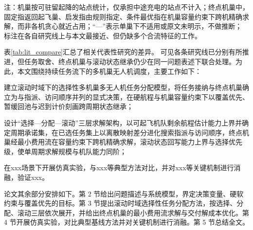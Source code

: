 \begin{table}[!htb]
    \vspace{2pt}
    \begin{minipage}{\textwidth}
        \songti 注：机巢按可驻留起降的站点统计，仅承担中途充电的站点不计入；终点机巢中，固定指返回起飞巢、启发指由规则指定、条件最优指在机巢容量约束下跨机精确求解，而非各机贪心就近占用；``—''表示单巢下不适用或原文未明示，不做推断；\dag\,标注在各自研究线上与本文最接近、但仍缺多个合流特征的工作。
    \end{minipage}
\end{table}


表\ref{tab:lit_compare}汇总了相关代表性研究的差异。
可见各条研究线已分别有所推进，但任务取舍、终点机巢与滚动状态继承仍少在同一问题表述下联合处理。为此，本文围绕持续任务流下的多机巢无人机调度，主要工作如下：
\begin {enumerate*}[label=(\arabic*), itemjoin=\quad]
\item 建立滚动时域下的选择性多机巢多无人机任务分配模型，将任务接纳与终点机巢确立为与指派、访问顺序并列的显式决策，在硬航程与机巢容量约束下以覆盖优先、暂缓回池与迟到计价刻画跨周期状态继承；
\item 设计“选择—分配—滚动”三层求解架构，以可起飞机队剩余航程估计能力上界并确定周期承诺集，在已选任务集上以离散映射差分进化搜索指派与访问顺序，终点机巢经最小费用流在容量约束下跨机精确求解，滚动状态回写能力上界与选择优先级，使单周期求解规模与机队能力同阶；
\item 在xxx场景下开展仿真实验，与xxx等典型方法对比，并对xxx等关键机制进行消融，验证xxx。
\end {enumerate*}


论文其余部分安排如下。第 2 节给出问题描述与系统模型，界定决策变量、硬软约束与覆盖优先的目标。第 3 节提出滚动时域选择性任务分配方法，按选择、分配、滚动三层依次展开，并给出终点机巢的最小费用流求解与交付解成本优化。第 4 节开展仿真实验，对比典型基线方法并对关键机制进行消融。第 5 节总结全文。

